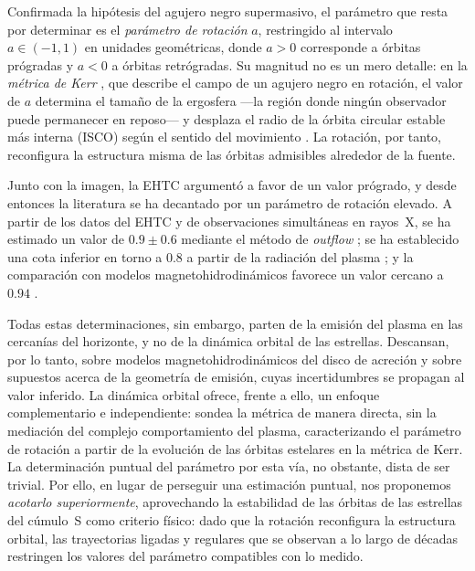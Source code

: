 Confirmada la hipótesis del agujero negro supermasivo, el parámetro que resta por determinar es el \emph{parámetro de rotación} $a$, restringido al intervalo $a\in(-1,1)$ en unidades geométricas, donde $a>0$ corresponde a órbitas prógradas y $a<0$ a órbitas retrógradas. Su magnitud no es un mero detalle: en la \emph{métrica de Kerr} \cite{kerr1963gravitational}, que describe el campo de un agujero negro en rotación, el valor de $a$ determina el tamaño de la ergosfera —la región donde ningún observador puede permanecer en reposo— y desplaza el radio de la órbita circular estable más interna (ISCO) según el sentido del movimiento \cite{bardeen1972rotating}. La rotación, por tanto, reconfigura la estructura misma de las órbitas admisibles alrededor de la fuente.

Junto con la imagen, la EHTC argumentó a favor de un valor prógrado, y desde entonces la literatura se ha decantado por un parámetro de rotación elevado. A partir de los datos del EHTC y de observaciones simultáneas en rayos~X, se ha estimado un valor de $0.9\pm0.6$ mediante el método de \emph{outflow} \cite{daly2023new}; se ha establecido una cota inferior en torno a $0.8$ a partir de la radiación del plasma \cite{yfantis2023fitting}; y la comparación con modelos magnetohidrodinámicos favorece un valor cercano a $0.94$ \cite{eht2024sgraVIII}.

Todas estas determinaciones, sin embargo, parten de la emisión del plasma en las cercanías del horizonte, y no de la dinámica orbital de las estrellas. Descansan, por lo tanto, sobre modelos magnetohidrodinámicos del disco de acreción y sobre supuestos acerca de la geometría de emisión, cuyas incertidumbres se propagan al valor inferido. La dinámica orbital ofrece, frente a ello, un enfoque complementario e independiente: sondea la métrica de manera directa, sin la mediación del complejo comportamiento del plasma, caracterizando el parámetro de rotación a partir de la evolución de las órbitas estelares en la métrica de Kerr. La determinación puntual del parámetro por esta vía, no obstante, dista de ser trivial. Por ello, en lugar de perseguir una estimación puntual, nos proponemos \emph{acotarlo superiormente}, aprovechando la estabilidad de las órbitas de las estrellas del cúmulo~S como criterio físico: dado que la rotación reconfigura la estructura orbital, las trayectorias ligadas y regulares que se observan a lo largo de décadas restringen los valores del parámetro compatibles con lo medido.


